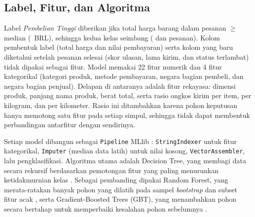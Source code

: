 \documentclass[11pt,a4paper]{article}
\newcommand{\f}[1]{\texttt{#1}}
\begin{document}
\subsection{Label, Fitur, dan Algoritma}
Label \emph{Pembelian Tinggi} diberikan jika total harga barang dalam pesanan
$\geq$ median (\ambang{}~BRL), sehingga kedua kelas seimbang (\nTinggi{} dan
\nRendah{} pesanan). Kolom pembentuk label (total harga dan nilai pembayaran) serta
kolom yang baru diketahui setelah pesanan selesai (skor ulasan, lama kirim, dan status
terlambat) tidak dipakai sebagai fitur. Model memakai 22 fitur numerik dan 4 fitur
kategorikal (kategori produk, metode pembayaran, negara bagian pembeli, dan negara
bagian penjual). Delapan di antaranya adalah fitur rekayasa: dimensi produk, panjang
nama produk, berat total, serta rasio ongkos kirim per item, per kilogram, dan per
kilometer. Rasio ini ditambahkan karena pohon keputusan hanya memotong satu fitur
pada setiap simpul, sehingga tidak dapat membentuk perbandingan antarfitur dengan
sendirinya.

Setiap model dibangun sebagai \f{Pipeline} MLlib \cite{sparkmllib}:
\f{StringIndexer} untuk fitur kategorikal, \f{Imputer} (median data latih) untuk nilai
kosong, \f{VectorAssembler}, lalu pengklasifikasi. Algoritma utama adalah Decision Tree,
yang membagi data secara rekursif berdasarkan pemotongan fitur yang paling menurunkan
ketidakmurnian kelas \cite{breiman1984,quinlan1986}. Sebagai pembanding dipakai Random
Forest, yang merata-ratakan banyak pohon yang dilatih pada sampel \emph{bootstrap} dan
subset fitur acak \cite{breiman2001}, serta Gradient-Boosted Trees (GBT), yang
menambahkan pohon secara bertahap untuk memperbaiki kesalahan pohon sebelumnya
\cite{friedman2001}.
\end{document}

